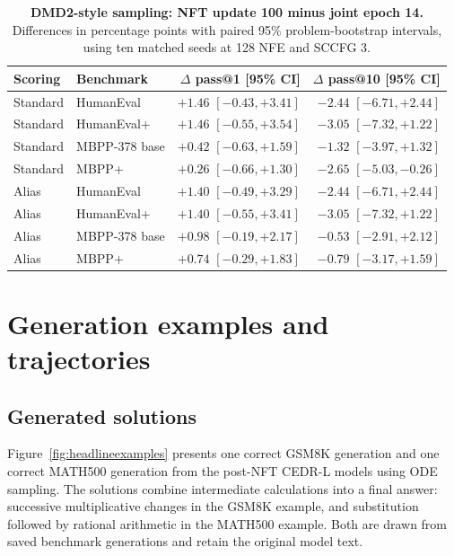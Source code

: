 \documentclass[11pt,letterpaper]{article}
\begin{document}
\begin{table}[htbp]
\centering\small
\setlength{\tabcolsep}{3pt}
\caption{\textbf{DMD2-style sampling: NFT update 100 minus joint epoch 14.} Differences in percentage points with paired 95\% problem-bootstrap intervals, using ten matched seeds at 128 NFE and SCCFG 3.}
\label{tab:codingsdedeltas}
\begin{tabular}{@{}llrr@{}}
\toprule
Scoring & Benchmark & $\Delta$ pass@1 [95\% CI] & $\Delta$ pass@10 [95\% CI]\\
\midrule
Standard & HumanEval & $+1.46$ {\scriptsize $[-0.43,+3.41]$} & $-2.44$ {\scriptsize $[-6.71,+2.44]$}\\
Standard & HumanEval+ & $+1.46$ {\scriptsize $[-0.55,+3.54]$} & $-3.05$ {\scriptsize $[-7.32,+1.22]$}\\
Standard & MBPP-378 base & $+0.42$ {\scriptsize $[-0.63,+1.59]$} & $-1.32$ {\scriptsize $[-3.97,+1.32]$}\\
Standard & MBPP+ & $+0.26$ {\scriptsize $[-0.66,+1.30]$} & $-2.65$ {\scriptsize $[-5.03,-0.26]$}\\
\midrule
Alias & HumanEval & $+1.40$ {\scriptsize $[-0.49,+3.29]$} & $-2.44$ {\scriptsize $[-6.71,+2.44]$}\\
Alias & HumanEval+ & $+1.40$ {\scriptsize $[-0.55,+3.41]$} & $-3.05$ {\scriptsize $[-7.32,+1.22]$}\\
Alias & MBPP-378 base & $+0.98$ {\scriptsize $[-0.19,+2.17]$} & $-0.53$ {\scriptsize $[-2.91,+2.12]$}\\
Alias & MBPP+ & $+0.74$ {\scriptsize $[-0.29,+1.83]$} & $-0.79$ {\scriptsize $[-3.17,+1.59]$}\\
\bottomrule
\end{tabular}
\end{table}


\section{Generation examples and trajectories}
\label{app:qualitative}

\subsection{Generated solutions}
\label{app:generations}

Figure~\ref{fig:headlineexamples} presents one correct GSM8K generation and one correct MATH500 generation from the post-NFT CEDR-L models using ODE sampling. The solutions combine intermediate calculations into a final answer: successive multiplicative changes in the GSM8K example, and substitution followed by rational arithmetic in the MATH500 example. Both are drawn from saved benchmark generations and retain the original model text.
\end{document}
